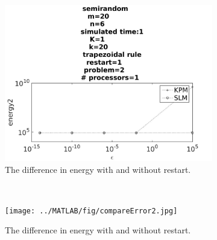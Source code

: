 
\begin{figure}[H]
        \centering
        \begin{subfigure}[b]{0.3\textwidth}
                \includegraphics[width=\textwidth]{../MATLAB/fig/compareEnergy2.jpg}
                \caption{ The difference in energy with and without restart. }
                \label{fig:compareEnergy2}
        \end{subfigure}
        ~
        \begin{subfigure}[b]{0.3\textwidth}
                \texttt{[image: ../MATLAB/fig/compareError2.jpg]}
                \caption{ The difference in energy with and without restart. }
                \label{fig:compareError2}
        \end{subfigure}
        ~
        \begin{subfigure}[b]{0.3\textwidth}

\end{subfigure}
\end{figure}

